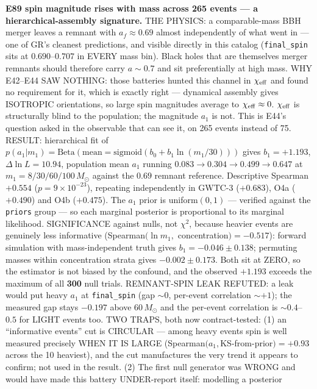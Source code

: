 \documentclass[10pt]{article}
\newcommand{\entry}[2]{\vspace{5pt}\noindent\textbf{#1}\quad #2\par}
\begin{document}
\entry{E89 spin magnitude rises with mass across 265 events --- a hierarchical-assembly signature.}{
THE PHYSICS: a comparable-mass BBH merger leaves a remnant with $a_f\approx0.69$ almost independently of
what went in --- one of GR's cleanest predictions, and visible directly in this catalog (\texttt{final\_spin}
sits at $0.690$--$0.707$ in EVERY mass bin). Black holes that are themselves merger remnants should
therefore carry $a\sim0.7$ and sit preferentially at high mass. WHY E42--E44 SAW NOTHING: those batteries
hunted this channel in $\chi_{\rm eff}$ and found no requirement for it, which is exactly right ---
dynamical assembly gives ISOTROPIC orientations, so large spin magnitudes average to $\chi_{\rm eff}\approx0$.
$\chi_{\rm eff}$ is structurally blind to the population; the magnitude $a_1$ is not. This is E44's question
asked in the observable that can see it, on 265 events instead of 75. RESULT: hierarchical fit of
$p(a_1|m_1)=\mathrm{Beta}(\mathrm{mean}=\mathrm{sigmoid}(b_0+b_1\ln(m_1/30)))$ gives $b_1=\mathbf{+1.193}$,
$\Delta\ln L=10.94$, population mean $a_1$ running $0.083\to0.304\to0.499\to\mathbf{0.647}$ at
$m_1=8/30/60/100\,M_\odot$ against the $0.69$ remnant reference. Descriptive Spearman $+0.554$
($p=9\times10^{-23}$), repeating independently in GWTC-3 ($+0.683$), O4a ($+0.490$) and O4b ($+0.475$). The
$a_1$ prior is uniform$(0,1)$ --- verified against the \texttt{priors} group --- so each marginal posterior
is proportional to its marginal likelihood. SIGNIFICANCE against nulls, not $\chi^2$, because heavier events
are genuinely less informative (Spearman$(\ln m_1,$ concentration$)=-0.517$): forward simulation with
mass-independent truth gives $b_1=-0.046\pm0.138$; permuting masses within concentration strata gives
$-0.002\pm0.173$. Both sit at ZERO, so the estimator is not biased by the confound, and the observed
$+1.193$ exceeds the maximum of all \textbf{300} null trials. REMNANT-SPIN LEAK REFUTED: a leak would put
heavy $a_1$ at \texttt{final\_spin} (gap ${\sim}0$, per-event correlation ${\sim}+1$); the measured gap stays
$-0.197$ above $60\,M_\odot$ and the per-event correlation is ${\sim}0.4$--$0.5$ for LIGHT events too.
TWO TRAPS, both now contract-tested: (1) an ``informative events'' cut is CIRCULAR --- among heavy events
spin is well measured precisely WHEN IT IS LARGE (Spearman$(a_1,$KS-from-prior$)=+0.93$ across the 10
heaviest), and the cut manufactures the very trend it appears to confirm; not used in the result. (2) The
first null generator was WRONG and would have made this battery UNDER-report itself: modelling a posterior
}
\end{document}
